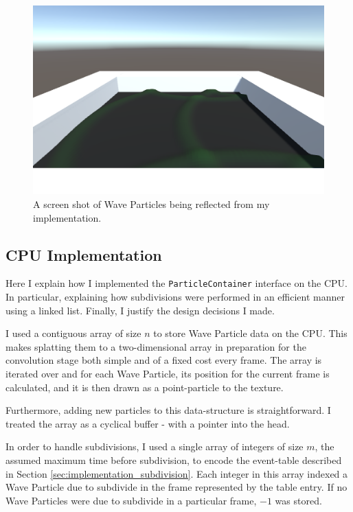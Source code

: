\documentclass[12pt,a4paper,twoside]{report}
\begin{document}
\begin{figure}[h]
\centering
\includegraphics[width=0.8\linewidth]{wave_particle_reflections}
\caption{A screen shot of Wave Particles being reflected from my
implementation.}
\label{fig:wave_particle_reflections}
\end{figure}


\subsection{CPU Implementation}
\label{sec:implementation_splat_cpu}

Here I explain how I implemented the \texttt{ParticleContainer}
interface on the CPU. In particular, explaining how subdivisions were performed
in an efficient manner using a linked list. Finally, I justify the design
decisions I made.

I used a contiguous array of size $n$ to store Wave Particle data on the CPU.
This makes splatting them to a two-dimensional array in preparation for the
convolution stage both simple and of a fixed cost every frame. The array is
iterated over and for each Wave Particle, its position for the current frame is
calculated, and it is then drawn as a point-particle to the texture.

Furthermore, adding new particles to this data-structure is straightforward. I
treated the array as a cyclical buffer - with a pointer into the head.

In order to handle subdivisions, I used a single array of integers of size $m$,
the assumed maximum time before subdivision, to encode the event-table
described in Section \ref{sec:implementation_subdivision}. Each integer in this
array indexed a Wave Particle due to subdivide in the frame represented by the
table entry. If no Wave Particles were due to subdivide in a particular frame,
$-1$ was stored.
\end{document}
